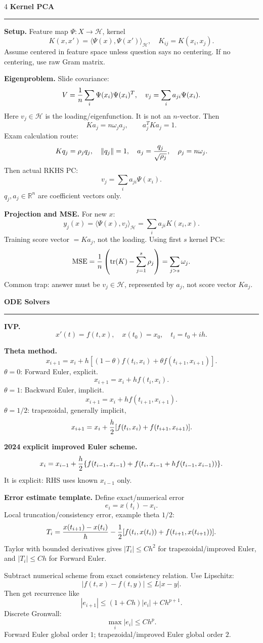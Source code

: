 \documentclass[10pt,a4paper,landscape]{article}
\newcommand{\topic}[1]{\vspace{2pt}\textbf{\large #1}\par\hrule\vspace{2pt}}
\newcommand{\subtopic}[1]{\textbf{#1.}}
\newcommand{\R}{\mathbb R}
\newcommand{\Hcal}{\mathcal H}
\begin{document}
\begin{multicols*}{4}
\topic{Kernel PCA}
\subtopic{Setup}
Feature map $\Psi:X\to\Hcal$, kernel
\[
K(x,x')=\langle \Psi(x),\Psi(x')\rangle_{\Hcal},\quad
K_{ij}=K(x_i,x_j).
\]
Assume centered in feature space unless question says no centering. If no centering, use raw Gram matrix.

\subtopic{Eigenproblem}
Slide covariance:
\[
V={1\over n}\sum_i \Psi(x_i)\Psi(x_i)^T,\quad
v_j=\sum_i a_{ji}\Psi(x_i).
\]
Here $v_j\in\Hcal$ is the loading/eigenfunction. It is not an $n$-vector.
Then
\[
Ka_j=n\omega_j a_j,\qquad a_j^TKa_j=1.
\]
Exam calculation route:
\[
Kq_j=\rho_jq_j,\quad \|q_j\|=1,\quad
a_j={q_j\over\sqrt{\rho_j}},\quad \rho_j=n\omega_j.
\]
Then actual RKHS PC:
\[
v_j=\sum_i a_{ji}\Psi(x_i).
\]
$q_j,a_j\in\R^n$ are coefficient vectors only.

\subtopic{Projection and MSE}
For new $x$:
\[
y_j(x)=\langle \Psi(x),v_j\rangle_{\Hcal}
=\sum_i a_{ji}K(x_i,x).
\]
Training score vector $=Ka_j$, not the loading.
Using first $s$ kernel PCs:
\[
\text{MSE}={1\over n}\left(\operatorname{tr}(K)-\sum_{j=1}^s\rho_j\right)
=\sum_{j>s}\omega_j.
\]
Common trap: answer must be $v_j\in\Hcal$, represented by $a_j$, not score vector $Ka_j$.

\topic{ODE Solvers}
\subtopic{IVP}
\[
x'(t)=f(t,x),\quad x(t_0)=x_0,\quad t_i=t_0+ih.
\]

\subtopic{Theta method}
\[
x_{i+1}=x_i+h[(1-\theta)f(t_i,x_i)+\theta f(t_{i+1},x_{i+1})].
\]
$\theta=0$: Forward Euler, explicit.
\[
x_{i+1}=x_i+hf(t_i,x_i).
\]
$\theta=1$: Backward Euler, implicit.
\[
x_{i+1}=x_i+hf(t_{i+1},x_{i+1}).
\]
$\theta=1/2$: trapezoidal, generally implicit,
\[
x_{i+1}=x_i+{h\over2}[f(t_i,x_i)+f(t_{i+1},x_{i+1})].
\]

\subtopic{2024 explicit improved Euler scheme}
\[
x_i=x_{i-1}+{h\over2}\{f(t_{i-1},x_{i-1})
 +f(t_i,x_{i-1}+hf(t_{i-1},x_{i-1}))\}.
\]
It is explicit: RHS uses known $x_{i-1}$ only.

\subtopic{Error estimate template}
Define exact/numerical error
\[
e_i=x(t_i)-x_i.
\]
Local truncation/consistency error, example theta $1/2$:
\[
T_i={x(t_{i+1})-x(t_i)\over h}
-{1\over2}[f(t_i,x(t_i))+f(t_{i+1},x(t_{i+1}))].
\]
Taylor with bounded derivatives gives $|T_i|\le Ch^2$ for trapezoidal/improved Euler, and $|T_i|\le Ch$ for Forward Euler.

Subtract numerical scheme from exact consistency relation. Use Lipschitz:
\[
|f(t,x)-f(t,y)|\le L|x-y|.
\]
Then get recurrence like
\[
|e_{i+1}|\le (1+Ch)|e_i|+Ch^{p+1}.
\]
Discrete Gronwall:
\[
\max_i |e_i|\le C h^p.
\]
Forward Euler global order $1$; trapezoidal/improved Euler global order $2$.


\end{multicols*}
\end{document}
